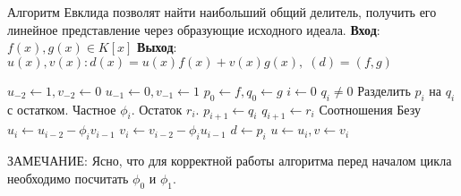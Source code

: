 \pagebreak

Алгоритм Евклида позволят найти наибольший общий делитель, получить его линейное представление через
образующие исходного идеала. {\bf Вход}: $ f(x), g(x) \in K[x] $ \newline
{\bf Выход}: $ u(x), v(x) : d(x) = u(x)f(x) + v(x)g(x), \; (d) = (f,g) $

\begin{codebox}
  \li $ u_{-2} \gets 1, v_{-2} \gets 0 $
  \li $ u_{-1} \gets 0, v_{-1} \gets 1 $
  \li $ p_{0} \gets f, q_{0} \gets g $ 
  \li $ i \gets 0 $
  \li \While $ q_{i} \ne 0 $ 
  \li \Do Разделить $ p_{i} $ на $ q_{i} $ с остатком. 
      \li \Comment Частное $ \phi_{i} $. Остаток $ r_{i} $.
      \li $ p_{i+1} \gets q_{i} $
      \li $ q_{i+1} \gets r_{i} $
      \li \Comment Соотношения Безу
      \li $ u_{i} \gets u_{i-2} - \phi_{i}v_{i-1} $
      \li $ v_{i} \gets v_{i-2} - \phi_{i}u_{i-1} $
      \End
  \li $ d \gets p_{i} $
  \li $ u \gets u_{i}, v \gets v_{i} $
\end{codebox}

ЗАМЕЧАНИЕ: Ясно, что для корректной работы алгоритма перед началом цикла необходимо посчитать $ \phi_{0} $ и 
$ \phi_{1} $.




